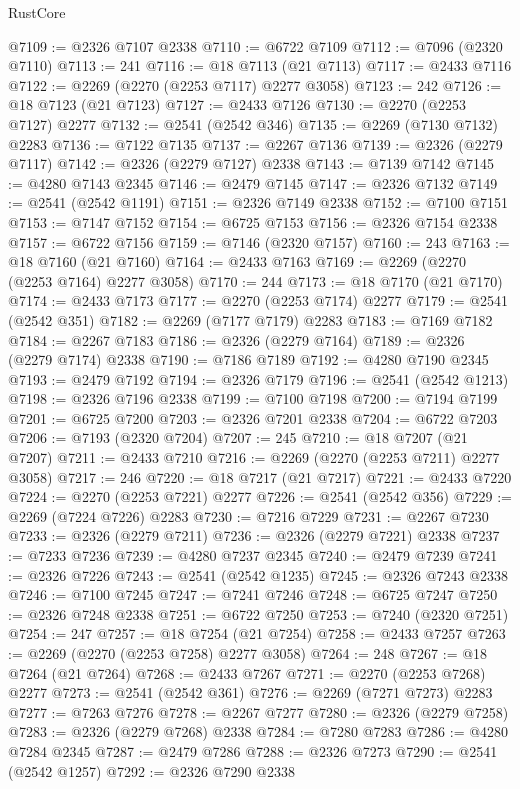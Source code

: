 \begin{lexlean}{RustCore}
\begin{coremodule}
@7109 := @2326 @7107 @2338
@7110 := @6722 @7109
@7112 := @7096 (@2320 @7110)
@7113 := 241
@7116 := @18 @7113 (@21 @7113)
@7117 := @2433 @7116
@7122 := @2269 (@2270 (@2253 @7117) @2277 @3058)
@7123 := 242
@7126 := @18 @7123 (@21 @7123)
@7127 := @2433 @7126
@7130 := @2270 (@2253 @7127) @2277
@7132 := @2541 (@2542 @346)
@7135 := @2269 (@7130 @7132) @2283
@7136 := @7122 @7135
@7137 := @2267 @7136
@7139 := @2326 (@2279 @7117)
@7142 := @2326 (@2279 @7127) @2338
@7143 := @7139 @7142
@7145 := @4280 @7143 @2345
@7146 := @2479 @7145
@7147 := @2326 @7132
@7149 := @2541 (@2542 @1191)
@7151 := @2326 @7149 @2338
@7152 := @7100 @7151
@7153 := @7147 @7152
@7154 := @6725 @7153
@7156 := @2326 @7154 @2338
@7157 := @6722 @7156
@7159 := @7146 (@2320 @7157)
@7160 := 243
@7163 := @18 @7160 (@21 @7160)
@7164 := @2433 @7163
@7169 := @2269 (@2270 (@2253 @7164) @2277 @3058)
@7170 := 244
@7173 := @18 @7170 (@21 @7170)
@7174 := @2433 @7173
@7177 := @2270 (@2253 @7174) @2277
@7179 := @2541 (@2542 @351)
@7182 := @2269 (@7177 @7179) @2283
@7183 := @7169 @7182
@7184 := @2267 @7183
@7186 := @2326 (@2279 @7164)
@7189 := @2326 (@2279 @7174) @2338
@7190 := @7186 @7189
@7192 := @4280 @7190 @2345
@7193 := @2479 @7192
@7194 := @2326 @7179
@7196 := @2541 (@2542 @1213)
@7198 := @2326 @7196 @2338
@7199 := @7100 @7198
@7200 := @7194 @7199
@7201 := @6725 @7200
@7203 := @2326 @7201 @2338
@7204 := @6722 @7203
@7206 := @7193 (@2320 @7204)
@7207 := 245
@7210 := @18 @7207 (@21 @7207)
@7211 := @2433 @7210
@7216 := @2269 (@2270 (@2253 @7211) @2277 @3058)
@7217 := 246
@7220 := @18 @7217 (@21 @7217)
@7221 := @2433 @7220
@7224 := @2270 (@2253 @7221) @2277
@7226 := @2541 (@2542 @356)
@7229 := @2269 (@7224 @7226) @2283
@7230 := @7216 @7229
@7231 := @2267 @7230
@7233 := @2326 (@2279 @7211)
@7236 := @2326 (@2279 @7221) @2338
@7237 := @7233 @7236
@7239 := @4280 @7237 @2345
@7240 := @2479 @7239
@7241 := @2326 @7226
@7243 := @2541 (@2542 @1235)
@7245 := @2326 @7243 @2338
@7246 := @7100 @7245
@7247 := @7241 @7246
@7248 := @6725 @7247
@7250 := @2326 @7248 @2338
@7251 := @6722 @7250
@7253 := @7240 (@2320 @7251)
@7254 := 247
@7257 := @18 @7254 (@21 @7254)
@7258 := @2433 @7257
@7263 := @2269 (@2270 (@2253 @7258) @2277 @3058)
@7264 := 248
@7267 := @18 @7264 (@21 @7264)
@7268 := @2433 @7267
@7271 := @2270 (@2253 @7268) @2277
@7273 := @2541 (@2542 @361)
@7276 := @2269 (@7271 @7273) @2283
@7277 := @7263 @7276
@7278 := @2267 @7277
@7280 := @2326 (@2279 @7258)
@7283 := @2326 (@2279 @7268) @2338
@7284 := @7280 @7283
@7286 := @4280 @7284 @2345
@7287 := @2479 @7286
@7288 := @2326 @7273
@7290 := @2541 (@2542 @1257)
@7292 := @2326 @7290 @2338

\end{coremodule}
\end{lexlean}
